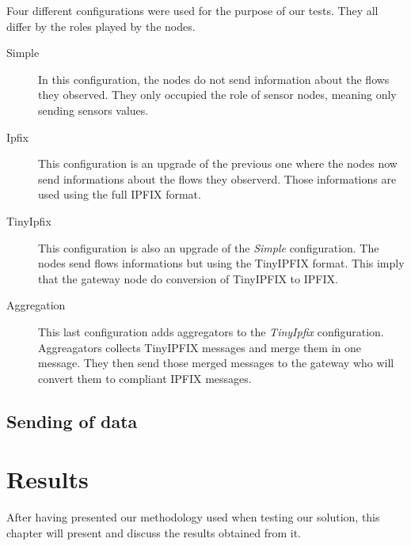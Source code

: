 Four different configurations were used for the purpose of our tests. They all differ by the roles played by the nodes.

\begin{description}
  \item[Simple] In this configuration, the nodes do not send information about the flows they observed. They only occupied the role of sensor nodes, meaning only sending sensors values.
  \item[Ipfix] This configuration is an upgrade of the previous one where the nodes now send informations about the flows they observerd. Those informations are used using the full IPFIX format.
  \item[TinyIpfix] This configuration is also an upgrade of the \textit{Simple} configuration. The nodes send flows informations but using the TinyIPFIX format. This imply that the gateway node do conversion of TinyIPFIX to IPFIX.
  \item[Aggregation] This last configuration adds aggregators to the \textit{TinyIpfix} configuration. Aggreagators collects TinyIPFIX messages and merge them in one message. They then send those merged messages to the gateway who will convert them to compliant IPFIX messages.
\end{description}

\section{Sending of data}


\chapter{Results}

After having presented our methodology used when testing our solution, this chapter will present and discuss the results obtained from it.

